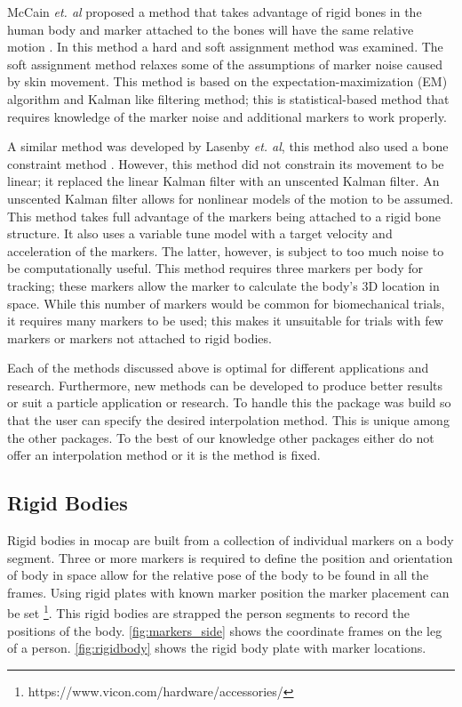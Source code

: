 McCain \textit{et. al} proposed a method that takes advantage of rigid bones in the human body and marker attached to the bones will have the same relative motion \cite{li2010bolero}. In this method a hard and soft assignment method was examined. The soft assignment method relaxes some of the assumptions of marker noise caused by skin movement. This method is based on the expectation-maximization (EM) algorithm and Kalman like filtering method; this is statistical-based method that requires knowledge of the marker noise and additional markers to work properly. 

A similar method was developed by Lasenby \textit{et. al}, this method also used a bone constraint method \cite{aristidou2013real}. However, this method did not constrain its movement to be linear; it replaced the linear Kalman filter with an unscented Kalman filter. An unscented Kalman filter allows for nonlinear models of the motion to be assumed. This method takes full advantage of the markers being attached to a rigid bone structure. It also uses a variable tune model with a target velocity and acceleration of the markers. The latter, however, is subject to too much noise to be computationally useful. This method requires three markers per body for tracking; these markers allow the marker to calculate the body's 3D location in space. While this number of markers would be common for biomechanical trials, it requires many markers to be used; this makes it unsuitable for trials with few markers or markers not attached to rigid bodies.

Each of the methods discussed above is optimal for different applications and research. Furthermore, new methods can be developed to produce better results or suit a particle application or research. To handle this the package was build so that the user can specify the desired interpolation method. This is unique among the other packages. To the best of our knowledge other packages either do not offer an interpolation method or it is the method is fixed.  

\subsection{Rigid Bodies}

Rigid bodies in mocap are built from a collection of individual markers on a body segment. Three or more markers is required to define the position and orientation of body in space allow for the relative pose of the body to be found in all the frames. Using rigid plates with known marker position the marker placement can be set \footnote{https://www.vicon.com/hardware/accessories/}. This rigid bodies are strapped the person segments to record the positions of the body. \autoref{fig:markers_side} shows the coordinate frames on the leg of a person. \autoref{fig:rigidbody} shows the rigid body plate with marker locations. 

